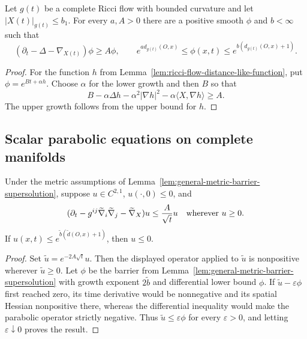 \begin{lemma}
\label{lem:ricci-flow-barrier-supersolution}

Let $g(t)$ be a complete Ricci flow with bounded curvature and let
$|X(t)|_{g(t)}\leq b_1$.  For every $a,A>0$ there are a positive smooth
$\phi$ and $b<\infty$ such that
\[
(\partial_t-\Delta-\nabla_{X(t)})\phi\geq A\phi,
\qquad
e^{a d_{g(t)}(O,x)}\leq\phi(x,t)\leq
e^{b(d_{g(t)}(O,x)+1)}.
\]
\end{lemma}

\begin{proof}
\sketch
{}
For the function $h$ from Lemma~\ref{lem:ricci-flow-distance-like-function},
put $\phi=e^{Bt+\alpha h}$.  Choose $\alpha$ for the lower growth and then
$B$ so that
\[
B-\alpha\Delta h-\alpha^2|\nabla h|^2-
\alpha\langle X,\nabla h\rangle\geq A.
\]
The upper growth follows from the upper bound for $h$.
\end{proof}

\subsection{Scalar parabolic equations on complete manifolds}

\begin{theorem}
\label{thm:complete-manifold-scalar-wmp-barrier}

Under the metric assumptions of Lemma~\ref{lem:general-metric-barrier-supersolution},
suppose $u\in C^{2,1}$, $u(\cdot,0)\leq0$, and
\[
(\partial_t-g^{ij}\widetilde\nabla_i\widetilde\nabla_j
-\widetilde\nabla_X)u\leq \frac A{\sqrt t}u
\quad\hbox{wherever }u\geq0.
\]
If $u(x,t)\leq e^{\widetilde b(\widetilde d(O,x)+1)}$, then $u\leq0$.
\end{theorem}

\begin{proof}
\sketch
{}
Set $\widetilde u=e^{-2A\sqrt t}u$.  Then the displayed operator applied to
$\widetilde u$ is nonpositive wherever $\widetilde u\geq0$.  Let $\phi$ be
the barrier from Lemma~\ref{lem:general-metric-barrier-supersolution} with
growth exponent $2\widetilde b$ and differential lower bound $\phi$.  If
$\widetilde u-\varepsilon\phi$ first reached zero, its time derivative would
be nonnegative and its spatial Hessian nonpositive there, whereas the
differential inequality would make the parabolic operator strictly negative.
Thus $\widetilde u\leq\varepsilon\phi$ for every $\varepsilon>0$, and letting
$\varepsilon\downarrow0$ proves the result.
\end{proof}

